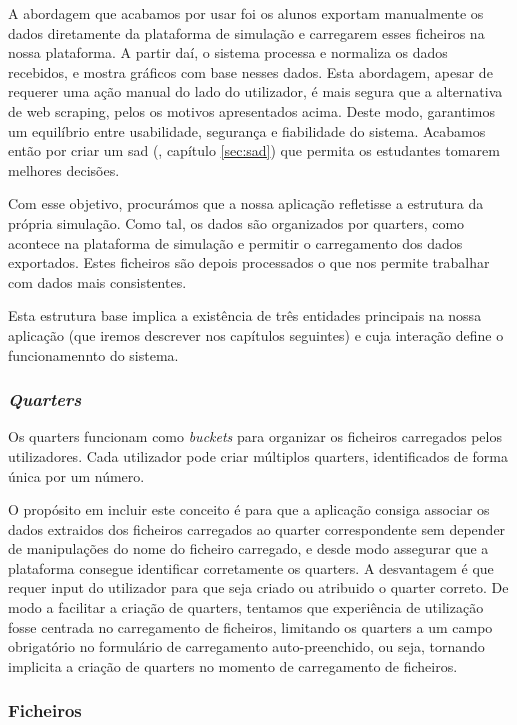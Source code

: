 A abordagem que acabamos por usar foi os alunos exportam manualmente os dados diretamente da plataforma de simulação e carregarem esses ficheiros na nossa plataforma. A partir daí, o sistema processa e normaliza os dados recebidos, e mostra gráficos com base nesses dados. Esta abordagem, apesar de requerer uma ação manual do lado do utilizador, é mais segura que a alternativa de web scraping, pelos os motivos apresentados acima. Deste modo, garantimos um equilíbrio entre usabilidade, segurança e fiabilidade do sistema. Acabamos então por criar um \gls{sad} (\cf, capítulo \ref{sec:sad}) que permita os estudantes tomarem melhores decisões.

Com esse objetivo, procurámos que a nossa aplicação refletisse a estrutura da própria simulação. Como tal, os dados são organizados por quarters, como acontece na plataforma de simulação e permitir o carregamento dos dados exportados. Estes ficheiros são depois processados o que nos permite trabalhar com dados mais consistentes. 

Esta estrutura base implica a existência de três entidades principais na nossa aplicação (que iremos descrever nos capítulos seguintes) e cuja interação define  o funcionamennto do sistema.


\subsubsection{\textit{Quarters}}

Os quarters funcionam como \textit{buckets} para organizar os ficheiros carregados pelos utilizadores. Cada utilizador pode criar múltiplos quarters, identificados de forma única por um número.

O propósito em incluir este conceito é para que a aplicação consiga associar os dados extraidos dos ficheiros carregados ao quarter correspondente sem depender de manipulações do nome do ficheiro carregado, e desde modo assegurar que a plataforma consegue identificar corretamente os quarters. A desvantagem é que requer input do utilizador para que seja criado ou atribuido o quarter correto. De modo a facilitar a criação de quarters, tentamos que experiência de utilização fosse centrada no carregamento de ficheiros, limitando os quarters a um campo obrigatório no formulário de carregamento auto-preenchido, ou seja, tornando implicita a criação de quarters no momento de carregamento de ficheiros.

\subsubsection{Ficheiros}

